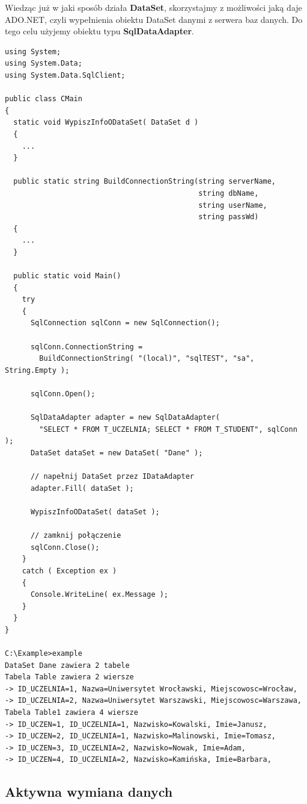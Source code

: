 Wiedząc już w jaki sposób działa {\bf DataSet}, skorzystajmy z możliwości jaką daje ADO.NET, czyli
wypełnienia obiektu DataSet danymi z serwera baz danych. Do tego celu użyjemy obiektu typu {\bf SqlDataAdapter}.

\begin{scriptsize}
\begin{verbatim}
using System;
using System.Data;
using System.Data.SqlClient;

public class CMain
{
  static void WypiszInfoODataSet( DataSet d )
  {
    ...
  }

  public static string BuildConnectionString(string serverName, 
                                             string dbName, 
                                             string userName, 
                                             string passWd)
  {
    ...
  }

  public static void Main()
  {
    try
    {
      SqlConnection sqlConn = new SqlConnection();
      	
      sqlConn.ConnectionString = 
        BuildConnectionString( "(local)", "sqlTEST", "sa", String.Empty );

      sqlConn.Open();

      SqlDataAdapter adapter = new SqlDataAdapter( 
        "SELECT * FROM T_UCZELNIA; SELECT * FROM T_STUDENT", sqlConn );
      DataSet dataSet = new DataSet( "Dane" );

      // napełnij DataSet przez IDataAdapter
      adapter.Fill( dataSet );

      WypiszInfoODataSet( dataSet );

      // zamknij połączenie
      sqlConn.Close();
    }
    catch ( Exception ex )
    {
      Console.WriteLine( ex.Message );
    } 
  }
}

C:\Example>example
DataSet Dane zawiera 2 tabele
Tabela Table zawiera 2 wiersze
-> ID_UCZELNIA=1, Nazwa=Uniwersytet Wrocławski, Miejscowosc=Wrocław,
-> ID_UCZELNIA=2, Nazwa=Uniwersytet Warszawski, Miejscowosc=Warszawa,
Tabela Table1 zawiera 4 wiersze
-> ID_UCZEN=1, ID_UCZELNIA=1, Nazwisko=Kowalski, Imie=Janusz,
-> ID_UCZEN=2, ID_UCZELNIA=1, Nazwisko=Malinowski, Imie=Tomasz,
-> ID_UCZEN=3, ID_UCZELNIA=2, Nazwisko=Nowak, Imie=Adam,
-> ID_UCZEN=4, ID_UCZELNIA=2, Nazwisko=Kamińska, Imie=Barbara,
\end{verbatim}
\end{scriptsize}

\subsection{Aktywna wymiana danych}

